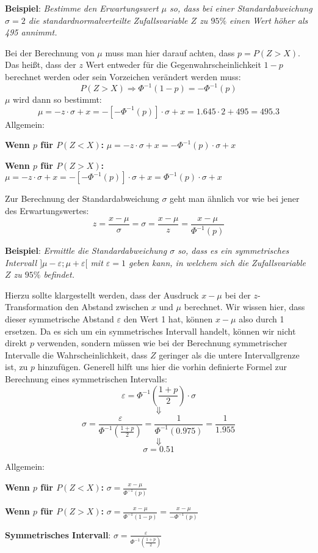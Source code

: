\textbf{Beispiel}: \emph{Bestimme den Erwartungswert $\mu$ so, dass bei einer Standardabweichung $\sigma = 2$ die standardnormalverteilte Zufallsvariable $Z$ zu $95 \%$ einen Wert h\"{o}her als 495 annimmt.}

Bei der Berechnung von $\mu$ muss man hier darauf achten, dass $p = P(Z > X)$. Das hei\ss{}t, dass der $z$ Wert entweder f\"{u}r die Gegenwahrscheinlichkeit $1 - p$ berechnet werden oder sein Vorzeichen ver\"{a}ndert werden muss: $$P(Z > X) \Rightarrow \Phi^{-1}(1 - p) = -\Phi^{-1}(p)$$ $\mu$ wird dann so bestimmt: $$\mu = -z \cdot \sigma + x = -[-\Phi^{-1}(p)] \cdot \sigma + x = 1.645 \cdot 2 + 495 = 495.3$$ Allgemein:

\textbf{Wenn $p$ f\"{u}r $P(Z < X)$:} $\mu = -z \cdot \sigma + x = -\Phi^{-1}(p) \cdot \sigma + x$

\textbf{Wenn $p$ f\"{u}r $P(Z > X)$:} $\mu = -z \cdot \sigma + x = -[-\Phi^{-1}(p)] \cdot \sigma + x = \Phi^{-1}(p) \cdot \sigma + x$

\pagebreak


Zur Berechnung der Standardabweichung $\sigma$ geht man \"{a}hnlich vor wie bei jener des Erwartungswertes: $$z = \frac{x - \mu}{\sigma} = \sigma = \frac{x - \mu}{z} = \frac{x - \mu}{\Phi^{-1}(p)}$$

\textbf{Beispiel}: \emph{Ermittle die Standardabweichung $\sigma$ so, dass es ein symmetrisches Intervall $]\mu - \varepsilon ; \mu + \varepsilon[$ mit $\varepsilon = 1$ geben kann, in welchem sich die Zufallsvariable $Z$ zu $95 \%$ befindet.}

Hierzu sollte klargestellt werden, dass der Ausdruck $x - \mu$ bei der $z$-Transformation den Abstand zwischen $x$ und $\mu$ berechnet. Wir wissen hier, dass dieser symmetrische Abstand $\varepsilon$ den Wert 1 hat, k\"{o}nnen $x-\mu$ also durch 1 ersetzen. Da es sich um ein symmetrisches Intervall handelt, k\"{o}nnen wir nicht direkt $p$ verwenden, sondern m\"{u}ssen wie bei der Berechnung symmetrischer Intervalle die Wahrscheinlichkeit, dass $Z$ geringer als die untere Intervallgrenze ist, zu $p$ hinzuf\"{u}gen. Generell hilft uns hier die vorhin definierte Formel zur Berechnung eines symmetrischen Intervalls: $$\varepsilon = \Phi^{-1}\left(\frac{1 + p}{2}\right) \cdot \sigma$$ $$\Downarrow$$ $$\sigma = \frac{\varepsilon}{\Phi^{-1}\left(\frac{1 + p}{2}\right)} = \frac{1}{\Phi^{-1}(0.975)} = \frac{1}{1.955}$$ $$\Downarrow$$ $$\sigma = 0.51$$

Allgemein:

\textbf{Wenn $p$ f\"{u}r $P(Z < X)$:} $\sigma = \frac{x - \mu}{\Phi^{-1}(p)}$

\textbf{Wenn $p$ f\"{u}r $P(Z > X)$:} $\sigma = \frac{x - \mu}{\Phi^{-1}(1 - p)} = \frac{x - \mu}{-\Phi^{-1}(p)}$

\textbf{Symmetrisches Intervall}: $\sigma = \frac{\varepsilon}{\Phi^{-1}\left(\frac{1 + p}{2}\right)}$

